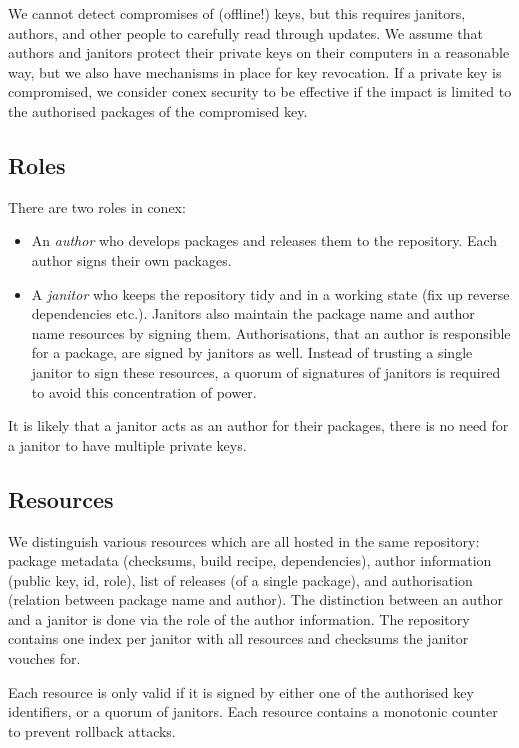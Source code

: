 \documentclass[nocopyrightspace]{sigplanconf}
\begin{document}

We cannot detect compromises of (offline!) keys, but this requires janitors, authors, and other people to carefully read through updates.
We assume that authors and janitors protect their private keys on their computers in a reasonable way, but we also have mechanisms in place for key revocation.
If a private key is compromised, we consider conex security to be effective if the impact is limited to the authorised packages of the compromised key.

\subsection{Roles}
There are two roles in conex:
\begin{itemize}
  \item An \emph{author} who develops packages and releases them to the repository.  Each author signs their own packages.
  \item A \emph{janitor} who keeps the repository tidy and in a working state (fix up reverse dependencies etc.).  Janitors also maintain the package name and author name resources by signing them.  Authorisations, that an author is responsible for a package, are signed by janitors as well.  Instead of trusting a single janitor to sign these resources, a quorum of signatures of janitors is required to avoid this concentration of power.
\end{itemize}

It is likely that a janitor acts as an author for their packages, there is no need for a janitor to have multiple private keys.

\subsection{Resources}
We distinguish various resources which are all hosted in the same repository:
package metadata (checksums, build recipe, dependencies), author information (public key, id, role), list of releases (of a single package), and authorisation (relation between package name and author).
The distinction between an author and a janitor is done via the role of the author information.
The repository contains one index per janitor with all resources and checksums the janitor vouches for.

Each resource is only valid if it is signed by either one of the authorised key identifiers, or a quorum of janitors.
Each resource contains a monotonic counter to prevent rollback attacks.
\end{document}
